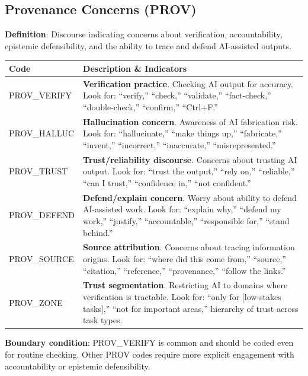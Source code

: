 \documentclass[11pt]{article}
\begin{document}
\subsection{Provenance Concerns (PROV)}

\begin{tcolorbox}[colback=provcolor!10, colframe=provcolor!80, title=\textbf{PROV: Provenance and Accountability Concern Codes}, fonttitle=\bfseries\sffamily]

\textbf{Definition}: Discourse indicating concerns about verification, accountability, epistemic defensibility, and the ability to trace and defend AI-assisted outputs.

\vspace{0.5em}
\begin{tabular}{@{}p{3.5cm}p{10cm}@{}}
\toprule
\textbf{Code} & \textbf{Description \& Indicators} \\
\midrule
PROV\_VERIFY & \textbf{Verification practice}. Checking AI output for accuracy. Look for: ``verify,'' ``check,'' ``validate,'' ``fact-check,'' ``double-check,'' ``confirm,'' ``Ctrl+F.'' \\[0.5em]
PROV\_HALLUC & \textbf{Hallucination concern}. Awareness of AI fabrication risk. Look for: ``hallucinate,'' ``make things up,'' ``fabricate,'' ``invent,'' ``incorrect,'' ``inaccurate,'' ``misrepresented.'' \\[0.5em]
PROV\_TRUST & \textbf{Trust/reliability discourse}. Concerns about trusting AI output. Look for: ``trust the output,'' ``rely on,'' ``reliable,'' ``can I trust,'' ``confidence in,'' ``not confident.'' \\[0.5em]
PROV\_DEFEND & \textbf{Defend/explain concern}. Worry about ability to defend AI-assisted work. Look for: ``explain why,'' ``defend my work,'' ``justify,'' ``accountable,'' ``responsible for,'' ``stand behind.'' \\[0.5em]
PROV\_SOURCE & \textbf{Source attribution}. Concerns about tracing information origins. Look for: ``where did this come from,'' ``source,'' ``citation,'' ``reference,'' ``provenance,'' ``follow the links.'' \\[0.5em]
PROV\_ZONE & \textbf{Trust segmentation}. Restricting AI to domains where verification is tractable. Look for: ``only for [low-stakes tasks],'' ``not for important areas,'' hierarchy of trust across task types. \\
\bottomrule
\end{tabular}

\vspace{0.5em}
\textbf{Boundary condition}: PROV\_VERIFY is common and should be coded even for routine checking. Other PROV codes require more explicit engagement with accountability or epistemic defensibility.
\end{tcolorbox}
\end{document}

